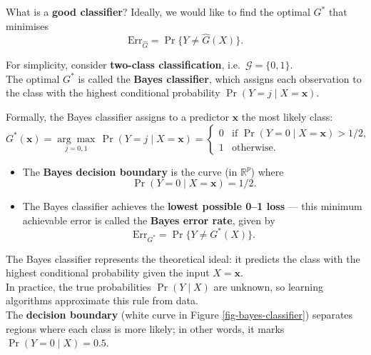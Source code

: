 \documentclass[
  letterpaper,
  DIV=11,
  numbers=noendperiod]{scrartcl}
\begin{document}
What is a \textbf{good classifier}? Ideally, we would like to find the
optimal \(G^*\) that minimises\\
\[ \text{Err}_{\hat{G}} = \Pr\{Y \ne \hat{G}(X)\}. \]

For simplicity, consider \textbf{two-class classification},
i.e.~\(\mathcal{G} = \{0, 1\}\).\\
The optimal \(G^*\) is called the \textbf{Bayes classifier}, which
assigns each observation to the class with the highest conditional
probability \(\Pr(Y = j \mid X = \mathbf{x})\).

Formally, the Bayes classifier assigns to a predictor \(\mathbf{x}\) the
most likely class:
\[ G^*(\mathbf{x}) = \underset{j = 0, 1}{\arg\max} \, \Pr(Y = j \mid X = \mathbf{x}) = 
  \begin{cases}
  0 & \text{if } \Pr(Y = 0 \mid X = \mathbf{x}) > 1/2, \\
  1 & \text{otherwise.}
  \end{cases} \]

\begin{itemize}
\item
  The \textbf{Bayes decision boundary} is the curve (in
  \(\mathbb{R}^p\)) where\\
  \[ \Pr(Y = 0 \mid X = \mathbf{x}) = 1/2. \]
\item
  The Bayes classifier achieves the \textbf{lowest possible 0–1 loss}
  --- this minimum achievable error is called the
  \textbf{Bayes error rate}, given by\\
  \[ \text{Err}_{G^*} = \Pr\{Y \ne G^*(X)\}. \]
\end{itemize}

The Bayes classifier represents the theoretical ideal: it predicts the
class with the highest conditional probability given the input
\(X = \mathbf{x}\).\\
In practice, the true probabilities \(\Pr(Y \mid X)\) are unknown, so
learning algorithms approximate this rule from data.\\
The \textbf{decision boundary} (white curve in Figure
\ref{fig-bayes-classifier}) separates regions where each class is more
likely; in other words, it marks \(\Pr(Y = 0 \mid X) = 0.5\).
\end{document}
